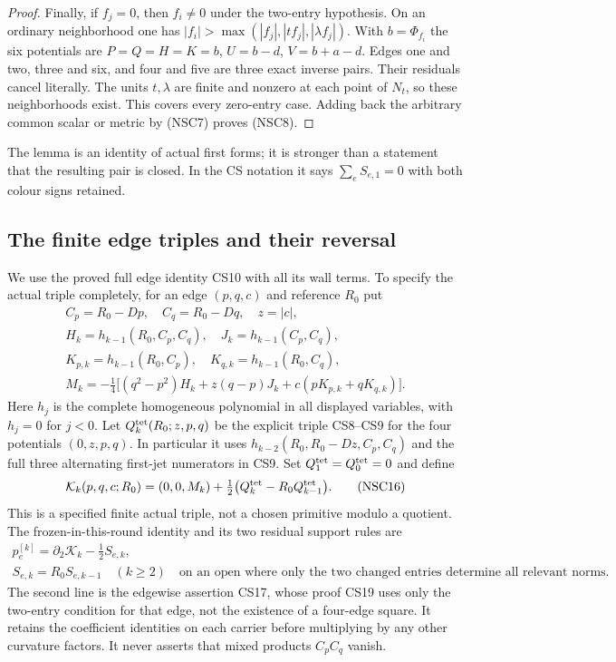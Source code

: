 \begin{proof}
Finally, if $f_j=0$, then $f_i\ne0$ under the two-entry
hypothesis.  On an ordinary neighborhood one has
$|f_i|>\max(|f_j|,|t f_j|,|\lambda f_j|)$.
With $b=\Phi_{f_i}$ the six potentials are
$P=Q=H=K=b$, $U=b-d$, $V=b+a-d$.
Edges one and two, three and six, and four and five
are three exact inverse pairs.  Their residuals cancel
literally.  The units $t,\lambda$ are finite and nonzero
at each point of $N_t$, so these neighborhoods exist.
This covers every zero-entry case.  Adding back the
arbitrary common scalar or metric by (NSC7) proves (NSC8).
\end{proof}

The lemma is an identity of actual first forms; it is
stronger than a statement that the resulting pair is
closed.  In the CS notation it says
$\sum_e S_{e,1}=0$ with both colour signs retained.

\subsection{The finite edge triples and their reversal}

We use the proved full edge identity CS10 with all its
wall terms.  To specify the actual triple completely,
for an edge $(p,q,c)$ and reference $R_0$ put
\[
 \begin{gathered}
 C_p=R_0-Dp,\quad C_q=R_0-Dq,\quad z=|c|,\\
 H_k=h_{k-1}(R_0,C_p,C_q),\quad
 J_k=h_{k-1}(C_p,C_q),\\
 K_{p,k}=h_{k-1}(R_0,C_p),\quad
 K_{q,k}=h_{k-1}(R_0,C_q),\\
 M_k=-\tfrac14\bigl[(q^2-p^2)H_k+z(q-p)J_k
                               +c(pK_{p,k}+qK_{q,k})\bigr].
 \end{gathered}
 \tag{NSC15}
\]
Here $h_j$ is the complete homogeneous polynomial in
all displayed variables, with $h_j=0$ for $j<0$.
Let $Q_k^{\rm tet}(R_0;z,p,q)$ be the explicit triple
CS8--CS9 for the four potentials $(0,z,p,q)$.
In particular it uses
$h_{k-2}(R_0,R_0-Dz,C_p,C_q)$ and the full three
alternating first-jet numerators in CS9.
Set $Q_1^{\rm tet}=Q_0^{\rm tet}=0$ and define
\[
 \mathcal K_k(p,q,c;R_0)
     =(0,0,M_k)
          +\tfrac12\bigl(Q_k^{\rm tet}-R_0Q_{k-1}^{\rm tet}\bigr).
 \tag{NSC16}
\]
This is a specified finite actual triple, not a chosen
primitive modulo a quotient.  The frozen-in-this-round
identity and its two residual support rules are
\[
 \begin{gathered}
 p_e^{[k]}=\partial_2\mathcal K_k-\tfrac12 S_{e,k},\\
 S_{e,k}=R_0S_{e,k-1}\quad(k\geq2)
       \quad\text{on an open where only the two changed entries
       determine all relevant norms}.
 \end{gathered}
 \tag{NSC17}
\]
The second line is the edgewise assertion CS17, whose
proof CS19 uses only the two-entry condition for that
edge, not the existence of a four-edge square.
It retains the coefficient identities on each carrier
before multiplying by any other curvature factors.
It never asserts that mixed products $C_pC_q$ vanish.

